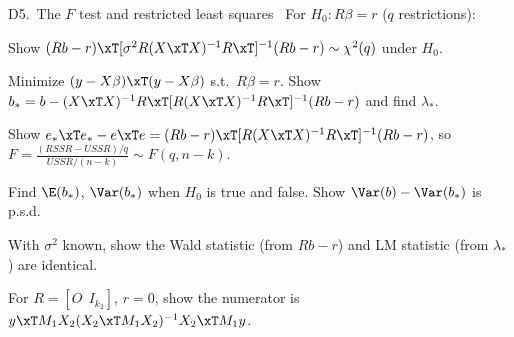 \begin{qbox}{D5.\ The $F$ test and restricted least squares}{\must\ \newtag}
For $H_{0}:R\beta=r$ ($q$ restrictions):
\begin{flatlist}
  \item[(a)] Show $(Rb-r)\xT[\sigma^{2}R(X\xT X)^{-1}R\xT]^{-1}(Rb-r)\sim\chi^{2}(q)$ under $H_{0}$.
  \item[(b)] Minimize $(y-X\beta)\xT(y-X\beta)$ s.t.\ $R\beta=r$. Show $b_{*}=b-(X\xT X)^{-1}R\xT[R(X\xT X)^{-1}R\xT]^{-1}(Rb-r)$ and find $\lambda_{*}$.
  \item[(c)] Show $e_{*}\xT e_{*}-e\xT e=(Rb-r)\xT[R(X\xT X)^{-1}R\xT]^{-1}(Rb-r)$, so $F=\frac{(RSSR-USSR)/q}{USSR/(n-k)}\sim F(q,n-k)$.
  \item[(d)] Find $\E(b_{*})$, $\Var(b_{*})$ when $H_{0}$ is true and false. Show $\Var(b)-\Var(b_{*})$ is p.s.d.
  \item[(e)] With $\sigma^{2}$ known, show the Wald statistic (from $Rb-r$) and LM statistic (from $\lambda_{*}$) are identical.
  \item[(f)] For $R=[O\ \ I_{k_{2}}]$, $r=0$, show the numerator is $y\xT M_{1}X_{2}(X_{2}\xT M_{1}X_{2})^{-1}X_{2}\xT M_{1}y$.
\end{flatlist}
\end{qbox}
